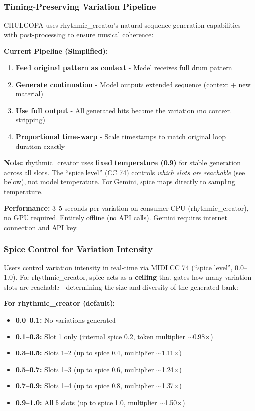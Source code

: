\documentclass{aimc2026}
\begin{document}
\subsubsection{Timing-Preserving Variation Pipeline}

CHULOOPA uses rhythmic\_creator's natural sequence generation capabilities with post-processing to ensure musical coherence:

\textbf{Current Pipeline (Simplified):}

\begin{enumerate}
\item \textbf{Feed original pattern as context} - Model receives full drum pattern
\item \textbf{Generate continuation} - Model outputs extended sequence (context + new material)
\item \textbf{Use full output} - All generated hits become the variation (no context stripping)
\item \textbf{Proportional time-warp} - Scale timestamps to match original loop duration exactly
\end{enumerate}

\textbf{Note:} rhythmic\_creator uses \textbf{fixed temperature (0.9)} for stable generation across all slots. The ``spice level'' (CC 74) controls \emph{which slots are reachable} (see below), not model temperature. For Gemini, spice maps directly to sampling temperature.

\textbf{Performance:} 3--5 seconds per variation on consumer CPU (rhythmic\_creator), no GPU required. Entirely offline (no API calls). Gemini requires internet connection and API key.

\subsubsection{Spice Control for Variation Intensity}

Users control variation intensity in real-time via MIDI CC 74 (``spice level'', 0.0--1.0). For rhythmic\_creator, spice acts as a \textbf{ceiling} that gates how many variation slots are reachable---determining the size and diversity of the generated bank:

\textbf{For rhythmic\_creator (default):}
\begin{itemize}
\item \textbf{0.0--0.1:} No variations generated
\item \textbf{0.1--0.3:} Slot 1 only (internal spice 0.2, token multiplier $\sim$0.98$\times$)
\item \textbf{0.3--0.5:} Slots 1--2 (up to spice 0.4, multiplier $\sim$1.11$\times$)
\item \textbf{0.5--0.7:} Slots 1--3 (up to spice 0.6, multiplier $\sim$1.24$\times$)
\item \textbf{0.7--0.9:} Slots 1--4 (up to spice 0.8, multiplier $\sim$1.37$\times$)
\item \textbf{0.9--1.0:} All 5 slots (up to spice 1.0, multiplier $\sim$1.50$\times$)
\end{itemize}
\end{document}
